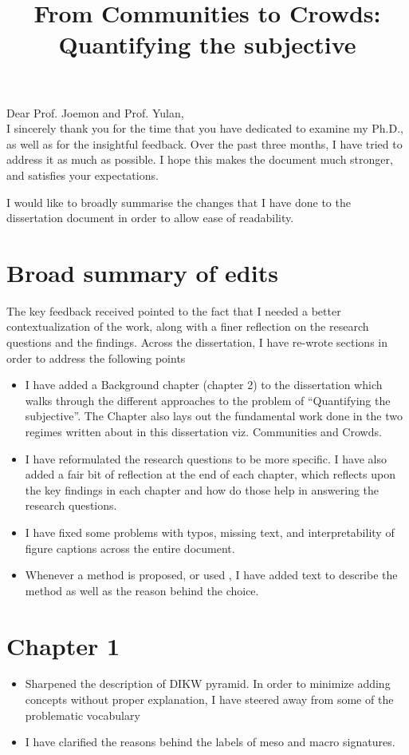 \documentclass[11pt,a4paper,roman]{moderncv}
\title{From Communities to Crowds: Quantifying the subjective}
\begin{document}
\maketitle

Dear Prof. Joemon and Prof. Yulan, \\


I sincerely thank you for the time that you have dedicated to examine my Ph.D., as well as for the insightful feedback. Over the past three months, I have tried to address it as much as possible. 
I hope this makes the document much stronger, and satisfies your expectations.


I would like to broadly summarise the changes that I have done to the dissertation document in order to allow ease of readability. 

\section{Broad summary of edits}
The key feedback received pointed to the fact that I needed a better contextualization of the work, along with a finer reflection on the research questions and the findings. Across the dissertation, I have re-wrote sections in order to address the following points 
\begin{itemize}
    \item I have added a Background chapter (chapter 2) to the dissertation which walks through the different approaches to the problem of ``Quantifying the subjective''. The Chapter also lays out the fundamental work done in the two regimes written about in this dissertation viz. Communities and Crowds. 
    \item I have reformulated the research questions to be more specific. I have also added a fair bit of reflection at the end of each chapter, which reflects upon the key findings in each chapter and how do those help in answering the research questions. 
    \item I have fixed some problems with typos, missing text, and interpretability of figure captions across the entire document. 
    \item Whenever a method is proposed, or used , I have added text to describe the method as well as the reason behind the choice. 
\end{itemize} 


\section{Chapter 1}
\begin{itemize}
    \item Sharpened the description of DIKW pyramid. In order to minimize adding concepts without proper explanation, I have steered away from some of the problematic vocabulary
    \item I have clarified the reasons behind the labels of meso and macro signatures.
\end{itemize}
\end{document}
